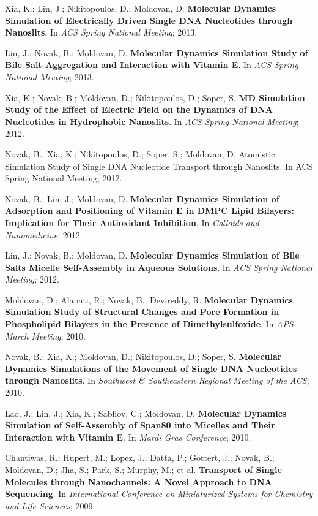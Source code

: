 \begin{cventries}
{\begin{cvitems}
        \item {Xia, K.; Lin, J.; Nikitopoulos, D.; Moldovan, D. \textbf{Molecular Dynamics Simulation of Electrically Driven Single DNA Nucleotides through Nanoslits}. In \textit{ACS Spring National Meeting}; 2013.}
        \item {Lin, J.; Novak, B.; Moldovan, D. \textbf{Molecular Dynamics Simulation Study of Bile Salt Aggregation and Interaction with Vitamin E}. In \textit{ACS Spring National Meeting}; 2013.}
        \item {Xia, K.; Novak, B.; Moldovan, D.; Nikitopoulos, D.; Soper, S. \textbf{MD Simulation Study of the Effect of Electric Field on the Dynamics of DNA Nucleotides in Hydrophobic Nanoslits}. In \textit{ACS Spring National Meeting}; 2012.}
        \item {Novak, B.; Xia, K.; Nikitopoulos, D.; Soper, S.; Moldovan, D. Atomistic Simulation Study of Single DNA Nucleotide Transport through Nanoslits. In ACS Spring National Meeting; 2012.}
        \item {Novak, B.; Lin, J.; Moldovan, D. \textbf{Molecular Dynamics Simulation of Adsorption and Positioning of Vitamin E in DMPC Lipid Bilayers: Implication for Their Antioxidant Inhibition}. In \textit{Colloids and Nanomedicine}; 2012.}
        \item {Lin, J.; Novak, B.; Moldovan, D. \textbf{Molecular Dynamics Simulation of Bile Salts Micelle Self-Assembly in Aqueous Solutions}. In \textit{ACS Spring National Meeting;} 2012.}
        \item {Moldovan, D.; Alapati, R.; Novak, B.; Devireddy, R. \textbf{Molecular Dynamics Simulation Study of Structural Changes and Pore Formation in Phospholipid Bilayers in the Presence of Dimethylsulfoxide}. In \textit{APS March Meeting}; 2010.}
        \item {Novak, B.; Xia, K.; Moldovan, D.; Nikitopoulos, D.; Soper, S. \textbf{Molecular Dynamics Simulations of the Movement of Single DNA Nucleotides through Nanoslits}. In \textit{Southwest \& Southeastern Regional Meeting of the ACS}; 2010.}
        \item {Lao, J.; Lin, J.; Xia, K.; Sabliov, C.; Moldovan, D. \textbf{Molecular Dynamics Simulation of Self-Assembly of Span80 into Micelles and Their Interaction with Vitamin E}. In \textit{Mardi Gras Conference}; 2010.}
        \item {Chantiwas, R.; Hupert, M.; Lopez, J.; Datta, P.; Gottert, J.; Novak, B.; Moldovan, D.; Jha, S.; Park, S.; Murphy, M.; et al. \textbf{Transport of Single Molecules through Nanochannels: A Novel Approach to DNA Sequencing}. In \textit{International Conference on Miniaturized Systems for Chemistry and Life Sciences}; 2009.}
      \end{cvitems}
    }
    
\end{cventries}
